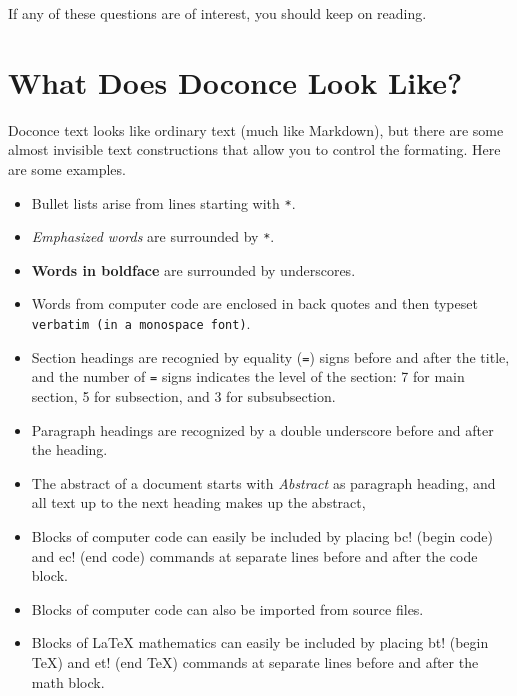 \documentclass[%
oneside,                 %
final,                   %
10pt]{article}
\begin{document}
\noindent
If any of these questions are of interest, you should keep on reading.


\section{What Does Doconce Look Like?}

Doconce text looks like ordinary text (much like Markdown), but there
are some almost invisible text constructions that allow you to control
the formating. Here are some examples.

\begin{itemize}
  \item Bullet lists arise from lines starting with {\fontsize{10pt}{10pt}\Verb!*!}.

  \item \emph{Emphasized words} are surrounded by {\fontsize{10pt}{10pt}\Verb!*!}.

  \item \textbf{Words in boldface} are surrounded by underscores.

  \item Words from computer code are enclosed in back quotes and
    then typeset {\fontsize{10pt}{10pt}\Verb!verbatim (in a monospace font)!}.

  \item Section headings are recognied by equality ({\fontsize{10pt}{10pt}\Verb!=!}) signs before
    and after the title, and the number of {\fontsize{10pt}{10pt}\Verb!=!} signs indicates the
    level of the section: 7 for main section, 5 for subsection, and
    3 for subsubsection.

  \item Paragraph headings are recognized by a double underscore
    before and after the heading.

  \item The abstract of a document starts with \emph{Abstract} as paragraph
    heading, and all text up to the next heading makes up the abstract,

  \item Blocks of computer code can easily be included by placing
    {\fontsize{10pt}{10pt}\Verb!!bc!} (begin code) and {\fontsize{10pt}{10pt}\Verb!!ec!} (end code) commands at separate lines
    before and after the code block.

  \item Blocks of computer code can also be imported from source files.

  \item Blocks of {\LaTeX} mathematics can easily be included by placing
    {\fontsize{10pt}{10pt}\Verb!!bt!} (begin TeX) and {\fontsize{10pt}{10pt}\Verb!!et!} (end TeX) commands at separate lines
    before and after the math block.


\end{itemize}
\end{document}
